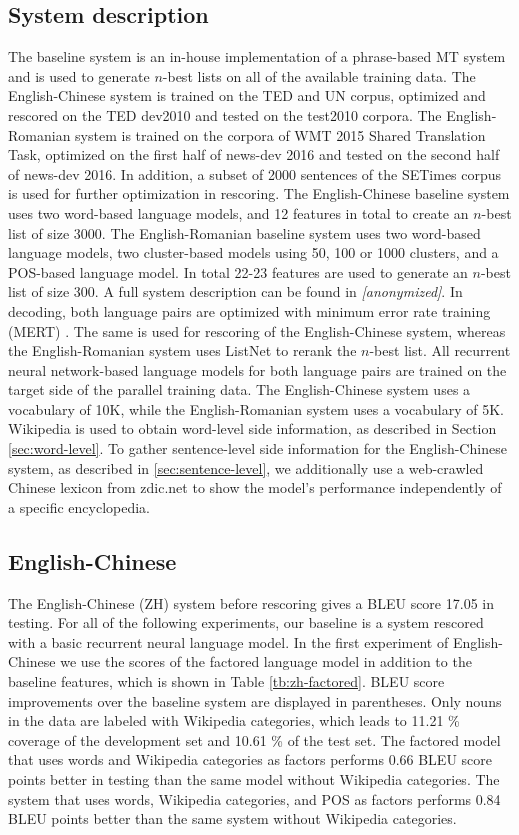 \documentclass[a4paper]{article}
\newcommand{\anony}[1]{\textit{[anonymized]}}
\begin{document}
\subsection{System description}
The baseline system is an in-house implementation of a phrase-based MT system and is used to generate $n$-best lists on all of the available training data. The English-Chinese system is trained on the TED and UN corpus, optimized and rescored on the TED dev2010 and tested on the test2010 corpora.
The English-Romanian system is trained on the corpora of WMT 2015 Shared Translation Task, optimized on the first half of news-dev 2016 and tested on the second half of news-dev 2016. In addition, a subset of 2000 sentences of the SETimes corpus is used for further optimization in rescoring.
The English-Chinese baseline system uses two word-based language models, and 12 features in total to create an $n$-best list of size 3000.
The English-Romanian baseline system uses two word-based language models, two cluster-based models using 50, 100 or 1000 clusters, and a POS-based language model. In total 22-23 features are used to generate an $n$-best list of size 300. A full system description can be found in \anony{niehuesusing}.
In decoding, both language pairs are optimized with minimum error rate training (MERT) \cite{och2003minimum}. The same is used for rescoring of the English-Chinese system, whereas the English-Romanian system uses ListNet to rerank the $n$-best list.
All recurrent neural network-based language models for both language pairs are trained on the target side of the parallel training data. The English-Chinese system uses a vocabulary of 10K, while the English-Romanian system uses a vocabulary of 5K. Wikipedia is used to obtain word-level side information, as described in Section \ref{sec:word-level}.
To gather sentence-level side information for the English-Chinese system, as described in \ref{sec:sentence-level}, we additionally use a web-crawled Chinese lexicon from zdic.net \cite{zdic} to show the model's performance independently of a specific encyclopedia.


\subsection{English-Chinese}
The English-Chinese (ZH) system before rescoring gives a BLEU score 17.05 in testing. For all of the following experiments, our baseline is a system rescored with a basic recurrent neural language model.
In the first experiment of English-Chinese we use the scores of the factored language model in addition to the baseline features, which is shown in Table \ref{tb:zh-factored}. BLEU score improvements over the baseline system are displayed in parentheses. Only nouns in the data are labeled with Wikipedia categories, which leads to 11.21 \% coverage of the development set and 10.61 \% of the test set. The factored model that uses words and Wikipedia categories as factors performs 0.66 BLEU score points better in testing than the same model without Wikipedia categories. The system that uses words, Wikipedia categories, and POS as factors performs 0.84 BLEU points better than the same system without Wikipedia categories.
\end{document}
